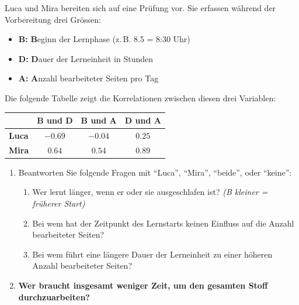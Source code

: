 \begin{myexercise}
	Luca und Mira bereiten sich auf eine Prüfung vor. Sie erfassen während der Vorbereitung drei Grössen:
	\begin{itemize}
		\item \textbf{B:} \textbf{B}eginn der Lernphase (z.\,B. 8.5 = 8:30 Uhr)
		\item \textbf{D:} \textbf{D}auer der Lerneinheit in Stunden
		\item \textbf{A:} \textbf{A}nzahl bearbeiteter Seiten pro Tag
	\end{itemize}
	Die folgende Tabelle zeigt die Korrelationen zwischen diesen drei Variablen:

	\begin{table}[H]
		\centering
		\begin{tabular}{lccc}

			              & \textbf{B und D} & \textbf{B und A} & \textbf{D und A} \\
			\midrule
			\textbf{Luca} & $-0.69$          & $-0.04$          & $0.25$           \\\midrule
			\textbf{Mira} & $0.64$           & $0.54$           & $0.89$           \\
		\end{tabular}
	\end{table}

	\begin{enumerate}
		\item Beantworten Sie folgende Fragen mit \enquote{Luca}, \enquote{Mira}, \enquote{beide}, oder \enquote{keine}:
		      \begin{enumerate}
			      \item Wer lernt länger, wenn er oder sie ausgeschlafen ist? \hfill \textit{(B kleiner = früherer Start)}
			      \item Bei wem hat der Zeitpunkt des Lernstarts keinen Einfluss auf die Anzahl bearbeiteter Seiten?
			      \item Bei wem führt eine längere Dauer der Lerneinheit zu einer höheren Anzahl bearbeiteter Seiten?
		      \end{enumerate}
		\item \textbf{Wer braucht insgesamt weniger Zeit, um den gesamten Stoff durchzuarbeiten?}
	\end{enumerate}


\end{myexercise}
